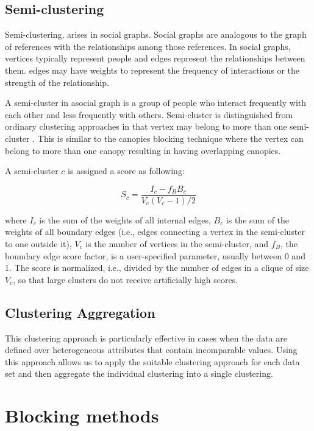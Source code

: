 \subsection{Semi-clustering}
Semi-clustering, arises in social graphs. Social graphs are analogous to the graph of references with the relationships among those references. In social graphs, vertices typically represent people and edges represent the relationships between them. edges may have weights to represent the frequency of interactions or the strength of the relationship\cite{MAB*10}.

A semi-cluster in asocial graph is a group of people who interact frequently with each other and less frequently with others\cite{MAB*10}. Semi-cluster is distinguished from ordinary clustering approaches in that vertex may belong to more than one semi-cluster \cite{MAB*10}. This is similar to the canopies blocking technique where the vertex can belong to more than one canopy resulting in having overlapping canopies.

A semi-cluster $c$ is assigned a score as following\cite{MAB*10}:

$$S_c=\frac{I_c-f_BB_c}{V_c(V_c-1)/2}$$

where $I_c$ is the sum of the weights of all internal edges, $B_c$ is the sum of the weights of all boundary edges (i.e., edges connecting a vertex in the semi-cluster to one outside it), $V_c$ is the number of vertices in the semi-cluster, and $f_B$, the boundary edge score factor, is a user-specified parameter, usually between 0 and 1. The score is normalized, i.e., divided by the number of edges in a clique of size $V_c$, so that large clusters do not receive artificially high scores\cite{MAB*10}.

  
\subsection{Clustering Aggregation}
This clustering approach is particularly effective in cases when the data are defined over heterogeneous attributes that contain incomparable values. Using this approach allows us to apply the suitable clustering approach for each data set and then aggregate the individual clustering into a single clustering\cite{GMTs07}.

\section{Blocking methods}

